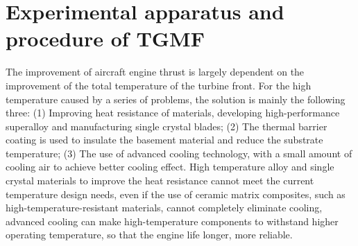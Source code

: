 \chapter{Experimental apparatus and procedure of TGMF}
The improvement of aircraft engine thrust is largely dependent on the improvement of the total temperature of the turbine front.
For the high temperature caused by a series of problems, the solution is mainly the following three:
(1) Improving heat resistance of materials, developing high-performance superalloy and manufacturing single crystal blades;
(2) The thermal barrier coating is used to insulate the basement material and reduce the substrate temperature;
(3) The use of advanced cooling technology, with a small amount of cooling air to achieve better cooling effect.
High temperature alloy and single crystal materials to improve the heat resistance cannot meet the current temperature design needs, even if the use of ceramic matrix composites, such as high-temperature-resistant materials, cannot completely eliminate cooling, advanced cooling can make high-temperature components to withstand higher operating temperature, so that the engine life longer, more reliable.

